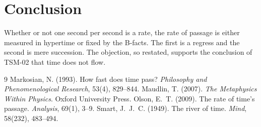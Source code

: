 \documentclass{situationist-preprint}
\begin{document}
\section{Conclusion}

Whether or not one second per second is a rate, the rate of passage is either measured in hypertime or fixed by the B-facts. The first is a regress and the second is mere succession. The objection, so restated, supports the conclusion of TSM-02 that time does not flow.

\begin{thebibliography}{9}
 Markosian, N. (1993). How fast does time pass? \emph{Philosophy and Phenomenological Research}, 53(4), 829--844.
 Maudlin, T. (2007). \emph{The Metaphysics Within Physics}. Oxford University Press.
 Olson, E.~T. (2009). The rate of time's passage. \emph{Analysis}, 69(1), 3--9.
 Smart, J.~J.~C. (1949). The river of time. \emph{Mind}, 58(232), 483--494.
\end{thebibliography}
\end{document}
